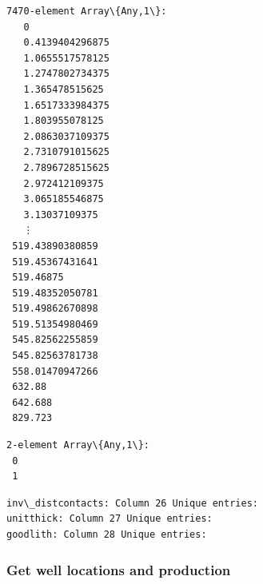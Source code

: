 \documentclass[11pt]{article}
\begin{document}
    \begin{Verbatim}[commandchars=\\\{\}]
7470-element Array\{Any,1\}:
   0
   0.4139404296875
   1.0655517578125
   1.2747802734375
   1.365478515625
   1.6517333984375
   1.803955078125
   2.0863037109375
   2.7310791015625
   2.7896728515625
   2.972412109375
   3.065185546875
   3.13037109375
   ⋮
 519.43890380859
 519.45367431641
 519.46875
 519.48352050781
 519.49862670898
 519.51354980469
 545.82562255859
 545.82563781738
 558.01470947266
 632.88
 642.688
 829.723
    \end{Verbatim}



    \begin{Verbatim}[commandchars=\\\{\}]
2-element Array\{Any,1\}:
 0
 1
    \end{Verbatim}


    \begin{Verbatim}[commandchars=\\\{\}]
inv\_distcontacts: Column 26 Unique entries:
unitthick: Column 27 Unique entries:
goodlith: Column 28 Unique entries:
    \end{Verbatim}

    \hypertarget{get-well-locations-and-production}{%
\subsubsection{Get well locations and
production}\label{get-well-locations-and-production}}
\end{document}
